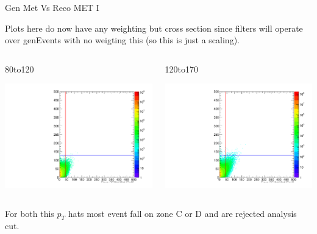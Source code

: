 \documentclass[8pt]{beamer}
\begin{document}
\begin{frame}{Gen Met Vs Reco MET I}

Plots here do now have any weighting but cross section since filters will operate over genEvents with no weigting this (so this is just a scaling).

\begin{columns}
    
\begin{block}{80to120}
 
\includegraphics[width=\linewidth]{img/MC_QCD-Pt-80to120-pythia6_GenVsReco_met}

\end{block}

\begin{block}{120to170}
 
\includegraphics[width=\linewidth]{img/MC_QCD-Pt-120to170-pythia6_GenVsReco_met}

\end{block}

\end{columns}

For both this $p_T$ hats most event fall on zone C or D and are rejected analysis cut.

\end{frame}
\end{document}
